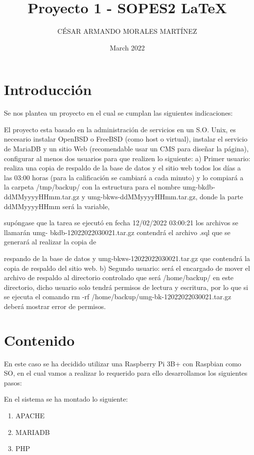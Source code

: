 \documentclass{article}
\title{Proyecto 1 - SOPES2 \LaTeX{}}
\author{CÉSAR ARMANDO MORALES MARTÍNEZ}
\date{March 2022}
\begin{document}
\maketitle

\section{Introducción}

Se nos plantea un proyecto en el cual se cumplan las siguientes indicaciones:

El proyecto esta basado en la administración de servicios en un S.O. Unix, es necesario instalar
OpenBSD o FreeBSD (como host o virtual), instalar el servicio de MariaDB y un sitio Web
(recomendable usar un CMS para diseñar la página), configurar al menos dos usuarios para que
realizen lo siguiente:
a) Primer usuario: realiza una copia de respaldo de la base de datos y el sitio web todos los días a
las 03:00 horas (para la calificación se cambiará a cada minuto) y lo compiará a la
carpeta /tmp/backup/ con la estructura para el nombre umg-bkdb-ddMMyyyyHHmm.tar.gz y
umg-bkws-ddMMyyyyHHmm.tar.gz, donde la parte ddMMyyyyHHmm será la variable,

supóngase que la tarea se ejecutó en fecha 12/02/2022 03:00:21 los archivos se llamarán umg-
bkdb-12022022030021.tar.gz contendrá el archivo .sql que se generará al realizar la copia de

respando de la base de datos y umg-bkws-12022022030021.tar.gz que contendrá la copia de
respaldo del sitio web.
b) Segundo usuario: será el encargado de mover el archivo de respaldo al directorio controlado que
será /home/backup/ en este directorio, dicho usuario solo tendrá permisos de lectura y escritura,
por lo que si se ejecuta el comando rm -rf /home/backup/umg-bk-12022022030021.tar.gz
deberá mostrar error de permisos.

\section{Contenido}

En este caso se ha decidido utilizar una Raspberry Pi 3B+ con Raspbian como SO, en el cual vamos a realizar lo requerido para ello desarrollamos los siguientes pasos:

En el sistema se ha montado lo siguiente:
\begin{enumerate}
    \item APACHE
    \item MARIADB
    \item PHP
\end{enumerate}
\end{document}
